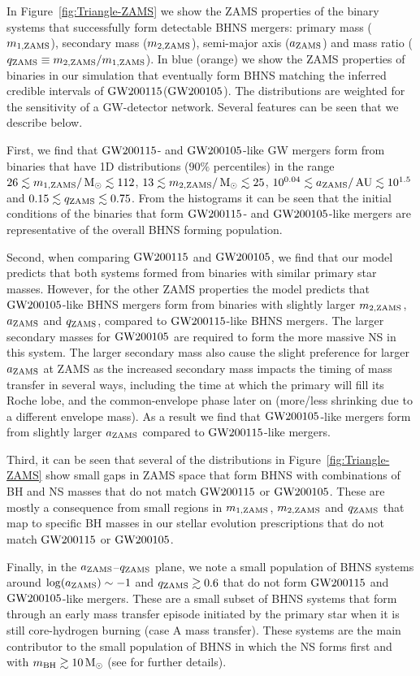 \documentclass{aastex63}
\newcommand{\monei}{\ensuremath{m_{1,\rm{ZAMS}}}\xspace}
\newcommand{\mtwoi}{\ensuremath{m_{2,\rm{ZAMS}}}\xspace}
\newcommand{\ai}{\ensuremath{a_{\rm{ZAMS}}}\xspace}
\newcommand{\qi}{\ensuremath{q_{\rm{ZAMS}}}\xspace}
\newcommand{\Msun}{\ensuremath{\,\rm{M}_{\odot}}\xspace}
\newcommand{\AU}{\ensuremath{\,\mathrm{AU}}\xspace}
\newcommand{\mbhf}{\ensuremath{m_{\rm{BH}}}\xspace}
\newcommand{\gwone}{\ensuremath{\rm{GW200115}}\xspace}
\newcommand{\gwzero}{\ensuremath{\rm{GW200105}}\xspace}
\begin{document}
In Figure~\ref{fig:Triangle-ZAMS} we show the \ac{ZAMS} properties of the binary systems that successfully form detectable \ac{BHNS} mergers: primary mass (\monei), secondary mass (\mtwoi), semi-major axis (\ai) and mass ratio ($\qi \equiv \mtwoi/\monei$). In blue (orange) we show the ZAMS properties of binaries in our simulation that eventually form \ac{BHNS} matching the inferred credible intervals of \gwone (\gwzero). The distributions are weighted for the sensitivity of a \ac{GW}-detector network.  Several features can be seen that we describe below. 

First, we find that \gwone- and \gwzero-like \ac{GW} mergers form from binaries that have 1D distributions ($90\%$ percentiles) in the range $26 \lesssim \monei / \Msun \lesssim 112$,  $13 \lesssim \mtwoi / \Msun \lesssim 25$, $10^{0.04} \lesssim \ai / \AU \lesssim 10^{1.5}$ and $0.15 \lesssim \qi \lesssim  0.75$. From the histograms it can be seen that the initial conditions of the binaries that form \gwone- and \gwzero-like mergers are representative of the overall \ac{BHNS} forming population.  

Second, when comparing \gwone and \gwzero, we find that our model predicts that both systems formed from binaries with similar primary star masses. However, for the other ZAMS properties the model predicts that \gwzero-like \ac{BHNS} mergers form from binaries with slightly larger \mtwoi, \ai and \qi, compared to \gwone-like \ac{BHNS} mergers. The larger secondary masses for \gwzero are required to form the more massive \ac{NS} in this system. The larger secondary mass also cause the slight preference for larger \ai at \ac{ZAMS} as the increased secondary mass impacts the timing of mass transfer in several ways, including the time at which the primary will fill its Roche lobe, and the common-envelope phase later on (more/less shrinking due to a different envelope mass). As a result we find that \gwzero-like mergers form from slightly larger \ai compared to \gwone-like mergers. 


Third, it can be seen that several of the distributions in Figure~\ref{fig:Triangle-ZAMS} show small gaps in ZAMS space that form \ac{BHNS} with combinations of \ac{BH} and \ac{NS} masses that do not match \gwone or \gwzero. These are mostly a consequence from small regions in \monei, \mtwoi and \qi that map to specific \ac{BH} masses in our stellar evolution prescriptions that do not match \gwone or \gwzero. 


Finally, in the $\ai$--$\qi$ plane, we note a small population of \ac{BHNS} systems around $\log(\ai) \sim -1$ and $\qi \gtrsim 0.6$ that do not form \gwone and \gwzero-like mergers. These are a small subset of \ac{BHNS} systems that form through an early mass transfer episode initiated by the primary star when it is still core-hydrogen burning (case A mass transfer). These systems are the main contributor to the small population of \ac{BHNS} in which the \ac{NS} forms first and with $\mbhf\gtrsim 10\Msun$ (see \citealt{Broekgaarden:2021} for further details).
\end{document}
